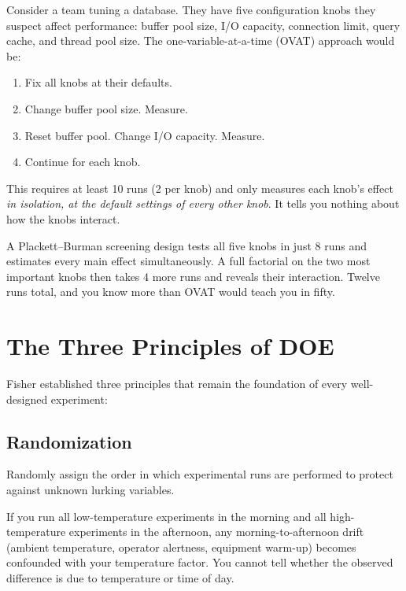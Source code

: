 \documentclass[11pt]{book}
\begin{document}
Consider a team tuning a database. They have five configuration knobs they
suspect affect performance: buffer pool size, I/O capacity, connection limit,
query cache, and thread pool size. The one-variable-at-a-time (OVAT) approach
would be:

\begin{enumerate}[nosep]
\item Fix all knobs at their defaults.
\item Change buffer pool size. Measure.
\item Reset buffer pool. Change I/O capacity. Measure.
\item Continue for each knob.
\end{enumerate}

This requires at least 10 runs (2 per knob) and only measures each knob's
effect \emph{in isolation, at the default settings of every other knob}. It
tells you nothing about how the knobs interact.

A Plackett--Burman screening design tests all five knobs in just 8 runs and
estimates every main effect simultaneously. A full factorial on the two most
important knobs then takes 4 more runs and reveals their interaction. Twelve
runs total, and you know more than OVAT would teach you in fifty.

\section{The Three Principles of DOE}

Fisher established three principles that remain the foundation of every
well-designed experiment:

\subsection{Randomization}

\begin{keypoint}[Randomization]
Randomly assign the order in which experimental runs are performed to protect
against unknown lurking variables.
\end{keypoint}

If you run all low-temperature experiments in the morning and all
high-temperature experiments in the afternoon, any morning-to-afternoon drift
(ambient temperature, operator alertness, equipment warm-up) becomes confounded
with your temperature factor. You cannot tell whether the observed difference is
due to temperature or time of day.
\end{document}
